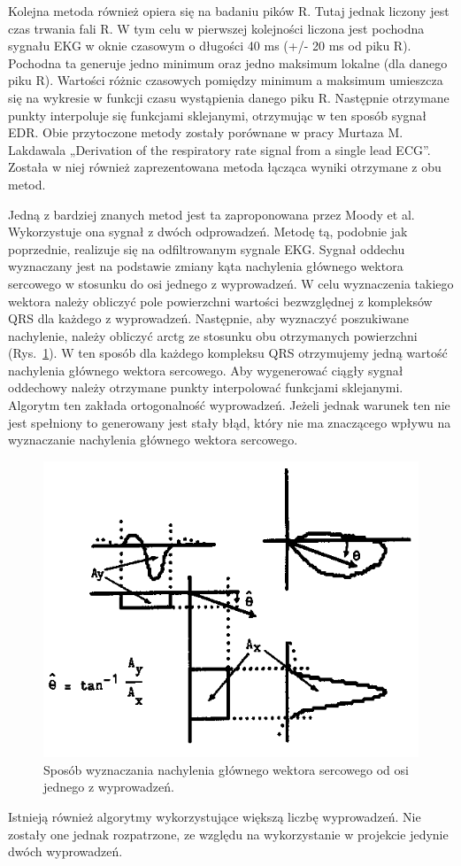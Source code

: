 		Kolejna metoda również opiera się na badaniu pików R. Tutaj jednak liczony jest czas trwania fali R. W tym celu w pierwszej kolejności liczona jest pochodna sygnału EKG w oknie czasowym o długości 40 ms (+/- 20 ms od piku R). Pochodna ta generuje jedno minimum oraz jedno maksimum lokalne (dla danego piku R). Wartości różnic czasowych pomiędzy minimum a maksimum umieszcza się na wykresie w funkcji czasu wystąpienia danego piku R. Następnie otrzymane punkty interpoluje się funkcjami sklejanymi, otrzymując w ten sposób sygnał EDR. Obie przytoczone metody zostały porównane w pracy Murtaza M. Lakdawala „Derivation of the respiratory rate signal from a single lead ECG”. Została w niej również zaprezentowana metoda łącząca wyniki otrzymane z obu metod.
	   
		Jedną z bardziej znanych metod jest ta zaproponowana przez Moody et al. Wykorzystuje ona sygnał z dwóch odprowadzeń. Metodę tą, podobnie jak poprzednie, realizuje się na odfiltrowanym sygnale EKG. Sygnał oddechu wyznaczany jest na podstawie zmiany kąta nachylenia głównego wektora sercowego w stosunku do osi jednego z wyprowadzeń. W celu wyznaczenia takiego wektora należy obliczyć pole powierzchni wartości bezwzględnej z kompleksów QRS dla każdego z wyprowadzeń. Następnie, aby wyznaczyć poszukiwane nachylenie, należy obliczyć arctg ze stosunku obu otrzymanych powierzchni (Rys.~\ref{fig:moody_alg}). W ten sposób dla każdego kompleksu QRS otrzymujemy jedną wartość nachylenia głównego wektora sercowego. Aby wygenerować ciągły sygnał oddechowy należy otrzymane punkty interpolować funkcjami sklejanymi. Algorytm ten zakłada ortogonalność wyprowadzeń. Jeżeli jednak warunek ten nie jest spełniony to generowany jest stały błąd, który nie ma znaczącego wpływu na wyznaczanie nachylenia głównego wektora sercowego.
	   
\begin{figure}[ht]
\centering
\includegraphics[width=12cm]{SIG_EDR/img/moody_alg.jpg}
\caption{Sposób wyznaczania nachylenia głównego wektora sercowego od osi jednego z wyprowadzeń.}
\label{fig:moody_alg}
\end{figure}
\newpage
		Istnieją również algorytmy wykorzystujące większą liczbę wyprowadzeń. Nie zostały one jednak rozpatrzone, ze względu na wykorzystanie w projekcie jedynie dwóch wyprowadzeń.
	   
